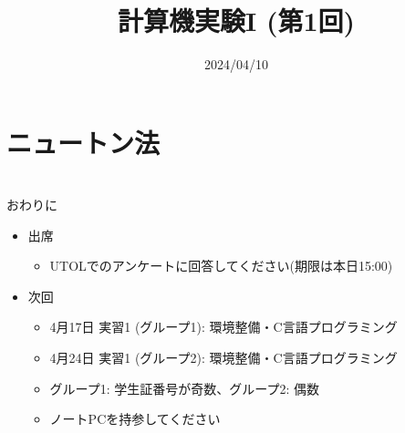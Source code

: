 \documentclass[10pt,dvipdfmx]{beamer}
\title{計算機実験I (第1回)}
\date{2024/04/10}
\begin{document}
\begin{frame}
  \titlepage
  \tableofcontents
\end{frame}







\section{ニュートン法}














\section{}
\begin{frame}[t]{おわりに}
  \begin{itemize}
  \item 出席
  \begin{itemize}
    \item UTOLでのアンケートに回答してください(期限は本日15:00)
  \end{itemize}
  \item 次回
    \begin{itemize}
    \item 4月17日 実習1 (グループ1): 環境整備・C言語プログラミング
    \item 4月24日 実習1 (グループ2): 環境整備・C言語プログラミング
    \item グループ1: 学生証番号が奇数、グループ2: 偶数
    \item ノートPCを持参してください
    \end{itemize}
  \end{itemize}
\end{frame}
\end{document}
